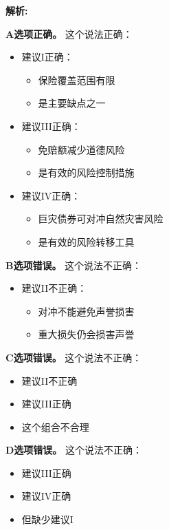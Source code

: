 \documentclass{article}
\newenvironment{explanation}
{\textbf{解析:}\par}
{\par}
\begin{document}
\begin{explanation}
    \textbf{A选项正确。}
    这个说法正确：
    \begin{itemize}
        \item 建议I正确：
        \begin{itemize}
            \item 保险覆盖范围有限
            \item 是主要缺点之一
        \end{itemize}
        \item 建议III正确：
        \begin{itemize}
            \item 免赔额减少道德风险
            \item 是有效的风险控制措施
        \end{itemize}
        \item 建议IV正确：
        \begin{itemize}
            \item 巨灾债券可对冲自然灾害风险
            \item 是有效的风险转移工具
        \end{itemize}
    \end{itemize}

    \textbf{B选项错误。}
    这个说法不正确：
    \begin{itemize}
        \item 建议II不正确：
        \begin{itemize}
            \item 对冲不能避免声誉损害
            \item 重大损失仍会损害声誉
        \end{itemize}
    \end{itemize}

    \textbf{C选项错误。}
    这个说法不正确：
    \begin{itemize}
        \item 建议II不正确
        \item 建议III正确
        \item 这个组合不合理
    \end{itemize}

    \textbf{D选项错误。}
    这个说法不正确：
    \begin{itemize}
        \item 建议III正确
        \item 建议IV正确
        \item 但缺少建议I
    \end{itemize}
\end{explanation}
\end{document}
